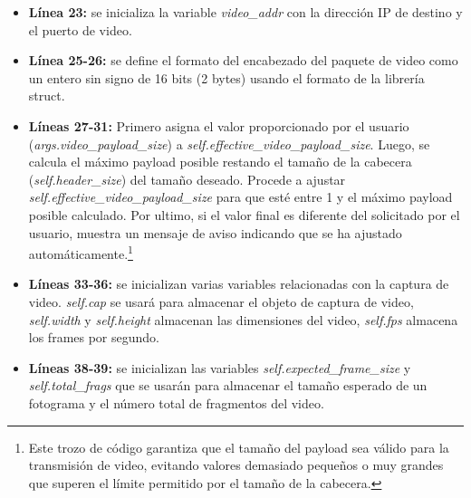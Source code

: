 \begin{itemize}
    \item \textbf{Línea 23:} se inicializa la variable \textit{video\_addr} con la dirección IP de destino y el puerto de video.
    \item \textbf{Línea 25-26:} se define el formato del encabezado del paquete de video como un entero sin signo de 16 bits (2 bytes) usando el formato de la librería struct. 
    \item \textbf{Líneas 27-31:} Primero asigna el valor proporcionado por el usuario (\textit{args.video\_payload\_size}) a \textit{self.effective\_video\_payload\_size}. Luego, se calcula el máximo payload posible restando el tamaño de la cabecera (\textit{self.header\_size}) del tamaño deseado. Procede a ajustar \textit{self.effective\_video\_payload\_size} para que esté entre 1 y el máximo payload posible calculado. Por ultimo, si el valor final es diferente del solicitado por el usuario, muestra un mensaje de aviso indicando que se ha ajustado automáticamente.\footnote{Este trozo de código garantiza que el tamaño del payload sea válido para la transmisión de video, evitando valores demasiado pequeños o muy grandes que superen el límite permitido por el tamaño de la cabecera.}
    \item \textbf{Líneas 33-36:} se inicializan varias variables relacionadas con la captura de video. \textit{self.cap} se usará para almacenar el objeto de captura de video, \textit{self.width} y \textit{self.height} almacenan las dimensiones del video, \textit{self.fps} almacena los frames por segundo.
    \item \textbf{Líneas 38-39:} se inicializan las variables \textit{self.expected\_frame\_size} y \textit{self.total\_frags} que se usarán para almacenar el tamaño esperado de un fotograma y el número total de fragmentos del video.
\end{itemize}

\vspace{\baselineskip}

